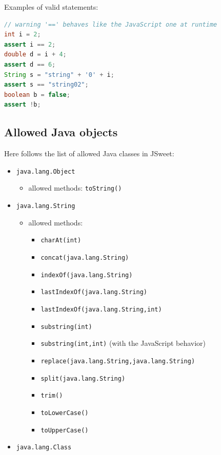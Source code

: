\documentclass[a4paper]{report}
\begin{document}
\noindent
Examples of valid statements:

\begin{lstlisting}[language=Java]
// warning '==' behaves like the JavaScript one at runtime
int i = 2;
assert i == 2;
double d = i + 4;
assert d == 6;
String s = "string" + '0' + i;
assert s == "string02";
boolean b = false;
assert !b;
\end{lstlisting}

\subsection{Allowed Java objects}

Here follows the list of allowed Java classes in JSweet:

\begin{itemize}
\item \texttt{java.lang.Object}
	\begin{itemize}
	\item allowed methods: \texttt{toString()}
	\end{itemize}
\item \texttt{java.lang.String}
	\begin{itemize}
	\item allowed methods: 
			\begin{itemize}
				\item \texttt{charAt(int)}
				\item \texttt{concat(java.lang.String)} 
				\item \texttt{indexOf(java.lang.String)}
				\item \texttt{lastIndexOf(java.lang.String)}
				\item \texttt{lastIndexOf(java.lang.String,int)}
				\item \texttt{substring(int)}
				\item \texttt{substring(int,int)} (with the JavaScript behavior)
				\item \texttt{replace(java.lang.String,java.lang.String)}
				\item \texttt{split(java.lang.String)}
				\item \texttt{trim()}
				\item \texttt{toLowerCase()}
				\item \texttt{toUpperCase()}
			\end{itemize}
	\end{itemize}
\item \texttt{java.lang.Class}
	\begin{itemize}

\end{itemize}
\end{itemize}
\end{document}
